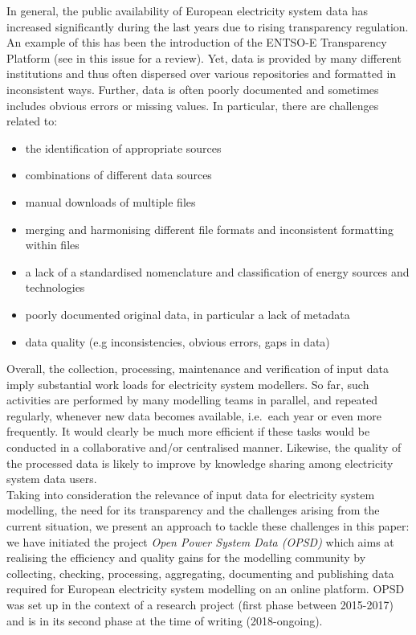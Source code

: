 \documentclass[article,sort&compress]{elsarticle}
\begin{document}
In general, the public availability of European electricity system data has increased significantly during the last years due to rising transparency regulation. An example of this has been the introduction of the ENTSO-E Transparency Platform \cite{ENTSO-E_TP} (see \cite{Hirth2018b} in this issue for a review). Yet, data is provided by many different institutions and thus often dispersed over various repositories and formatted in inconsistent ways. Further, data is often poorly documented and sometimes includes obvious errors or missing values. In particular, there are challenges related to:
\begin{itemize}
    \item the identification of appropriate sources
    \item combinations of different data sources
    \item manual downloads of multiple files
    \item merging and harmonising different file formats and inconsistent formatting within files
    \item a lack of a standardised nomenclature and classification of energy sources and technologies
    \item poorly documented original data, in particular a lack of metadata
    \item data quality (e.g inconsistencies, obvious errors, gaps in data)
\end{itemize}

Overall, the collection, processing, maintenance and verification of input data imply substantial work loads for electricity system modellers. So far, such activities are performed by many modelling teams in parallel, and repeated regularly, whenever new data becomes available, i.e.~each year or even more frequently. It would clearly be much more efficient if these tasks would be conducted in a collaborative and/or centralised manner. Likewise, the quality of the processed data is likely to improve by knowledge sharing among electricity system data users.\\

Taking into consideration the relevance of input data for electricity system modelling, the need for its transparency and the challenges arising from the current situation, we present an approach to tackle these challenges in this paper: we have initiated the project \textit{Open Power System Data (OPSD)} which aims at realising the efficiency and quality gains for the modelling community by collecting, checking, processing, aggregating, documenting and publishing data required for European electricity system modelling on an online platform. OPSD was set up in the context of a research project (first phase between 2015-2017) and is in its second phase at the time of writing (2018-ongoing).
\end{document}
